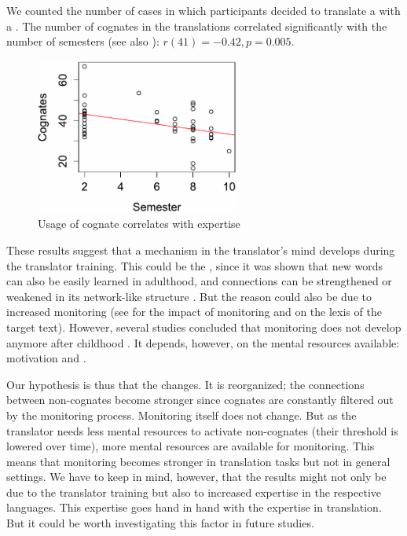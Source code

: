 \documentclass[output=paper]{LSP/langsci}
\begin{document}
We counted the number of cases in which participants decided to translate a   with a  . The number of cognates in the translations correlated significantly with the number of semesters (see also ): $r(41) = -0.42, p = 0.005$.

\begin{figure}
\includegraphics[width=0.6\textwidth]{figures/hansen-schirra/HansenSchirra8a.pdf}
\caption{Usage of cognate correlates with expertise}
\label{hansenschirraetal:fig:8}
\end{figure}

These results suggest that a mechanism in the translator's mind develops during the translator training. This could be the , since it was shown that new words can also be easily learned in adulthood, and connections can be strengthened or weakened in its network-like structure \citep{Aitchison2012}. But the reason could also be due to increased monitoring (see  for the impact of monitoring and  on the lexis of the target text). However, several studies concluded that monitoring does not develop anymore after childhood \citep{Wiersemaetal2007}. It depends, however, on the mental resources available: motivation \citep{GanushchakSchiller2008} and  \citep{GanushchakSchiller2006}.

Our hypothesis is thus that the  changes. It is reorganized; the connections between non-cognates become stronger since cognates are constantly filtered out by the monitoring process. Monitoring itself does not change. But as the translator needs less mental resources to activate non-cognates (their threshold is lowered over time), more mental resources are available for monitoring. This means that monitoring becomes stronger in translation tasks but not in general settings. We have to keep in mind, however, that the results might not only be due to the translator training but also to increased expertise in the respective languages. This expertise goes hand in hand with the expertise in translation. But it could be worth investigating this factor in future studies.
\end{document}
